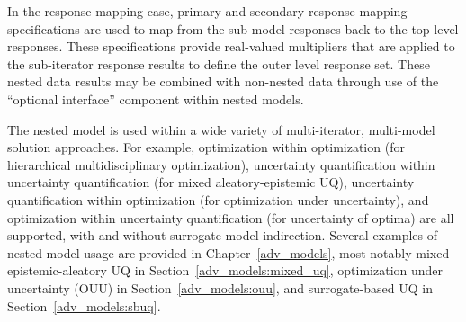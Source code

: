 In the response mapping case, primary and secondary response
mapping specifications are used to map from the sub-model responses
back to the top-level responses.  These specifications provide
real-valued multipliers that are applied to the sub-iterator response
results to define the outer level response set.  These nested data
results may be combined with non-nested data through use of the 
``optional interface'' component within nested models.

The nested model is used within a wide variety of multi-iterator,
multi-model solution approaches.  For example, optimization within
optimization (for hierarchical multidisciplinary optimization),
uncertainty quantification within uncertainty quantification (for
mixed aleatory-epistemic UQ), uncertainty quantification within
optimization (for optimization under uncertainty), and optimization
within uncertainty quantification (for uncertainty of optima) are all
supported, with and without surrogate model indirection.  Several
examples of nested model usage are provided in
Chapter~\ref{adv_models}, most notably mixed epistemic-aleatory UQ in
Section~\ref{adv_models:mixed_uq}, optimization under uncertainty
(OUU) in Section~\ref{adv_models:ouu}, and surrogate-based UQ in
Section~\ref{adv_models:sbuq}.
